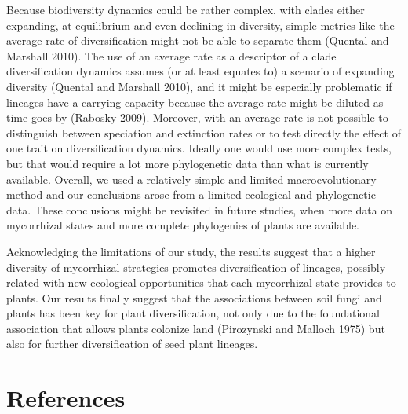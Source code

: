 \documentclass[
  12pt,
]{article}
\begin{document}
Because biodiversity dynamics could be rather complex, with clades
either expanding, at equilibrium and even declining in diversity, simple
metrics like the average rate of diversification might not be able to
separate them (Quental and Marshall 2010). The use of an average rate as
a descriptor of a clade diversification dynamics assumes (or at least
equates to) a scenario of expanding diversity (Quental and Marshall
2010), and it might be especially problematic if lineages have a
carrying capacity because the average rate might be diluted as time goes
by (Rabosky 2009). Moreover, with an average rate is not possible to
distinguish between speciation and extinction rates or to test directly
the effect of one trait on diversification dynamics. Ideally one would
use more complex tests, but that would require a lot more phylogenetic
data than what is currently available. Overall, we used a relatively
simple and limited macroevolutionary method and our conclusions arose
from a limited ecological and phylogenetic data. These conclusions might
be revisited in future studies, when more data on mycorrhizal states and
more complete phylogenies of plants are available.

Acknowledging the limitations of our study, the results suggest that a
higher diversity of mycorrhizal strategies promotes diversification of
lineages, possibly related with new ecological opportunities that each
mycorrhizal state provides to plants. Our results finally suggest that
the associations between soil fungi and plants has been key for plant
diversification, not only due to the foundational association that
allows plants colonize land (Pirozynski and Malloch 1975) but also for
further diversification of seed plant lineages.

\hypertarget{references}{%
\section{References}\label{references}}
\end{document}
